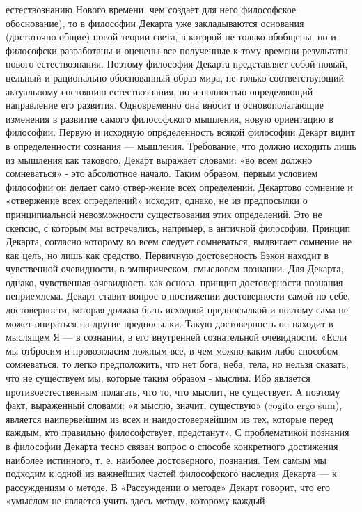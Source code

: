 \documentclass[12pt]{article}
\begin{document}
естествознанию Нового времени, чем создает для него философское обоснование), то в философии Декарта уже
закладываются  основания  (достаточно  общие)  новой  теории  света,  в  которой  не  только  обобщены,  но  и
философски  разработаны  и  оценены  все  полученные  к  тому  времени  результаты  нового  естествознания.
Поэтому философия Декарта представляет собой новый, цельный и рационально обоснованный образ мира, не
только соответствующий актуальному состоянию естествознания, но и полностью определяющий направление
его развития. Одновременно она вносит  и основополагающие  изменения в развитие  самого философского
мышления, новую ориентацию в философии.
Первую и исходную определенность всякой философии Декарт видит в определенности сознания — мышления.
Требование, что должно исходить лишь из мышления как такового, Декарт выражает словами: «во всем должно
сомневаться» - это абсолютное начало. Таким образом, первым условием философии он делает само отвер-жение всех определений.
Декартово сомнение и «отвержение всех определений» исходит, однако, не из предпосылки о принципиальной
невозможности существования этих определений. Это не скепсис, с которым мы встречались, например, в
античной философии. Принцип Декарта, согласно которому во всем следует сомневаться, выдвигает сомнение
не как цель, но лишь как средство.
Первичную достоверность Бэкон находит в чувственной очевидности, в эмпирическом, смысловом познании.
Для Декарта, однако, чувственная очевидность как основа, принцип достоверности познания неприемлема.
Декарт  ставит  вопрос  о  постижении  достоверности  самой  по  себе,  достоверности,  которая  должна  быть
исходной предпосылкой и поэтому сама не может опираться на другие предпосылки. Такую достоверность он
находит в мыслящем Я — в сознании, в его внутренней сознательной очевидности. «Если мы отбросим и
провозгласим ложным все, в чем можно каким-либо способом сомневаться, то легко предположить, что нет
бога, неба, тела, но нельзя сказать, что не существуем мы, которые таким образом - мыслим. Ибо является
противоестественным полагать, что то, что мыслит, не существует. А поэтому факт, выраженный словами: «я
мыслю, значит, существую» (cogito ergo sum), является наипервейшим из всех и наидостовернейшим из тех,
которые перед каждым, кто правильно философствует, предстанут».
С  проблематикой  познания  в  философии  Декарта тесно  связан  вопрос  о  способе конкретного достижения
наиболее истинного, т. е. наиболее достоверного, познания. Тем самым мы подходим к одной из важнейших
частей философского наследия Декарта — к рассуждениям о методе.
В «Рассуждении о методе» Декарт говорит, что его «умыслом не является учить здесь методу, которому каждый
\end{document}
